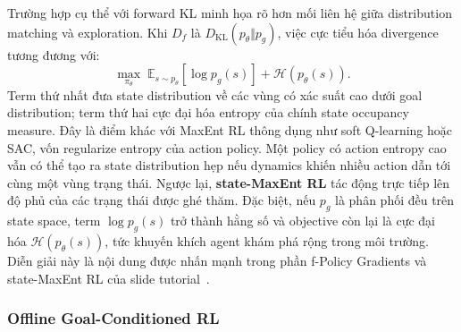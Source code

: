 Trường hợp cụ thể với forward KL minh họa rõ hơn mối liên hệ giữa distribution matching và exploration.
Khi $D_f$ là $D_{\mathrm{KL}}(p_\theta\Vert p_g)$, việc cực tiểu hóa divergence tương đương với:
\begin{equation}
    \max_{\pi_\theta}
    \;
    \mathbb{E}_{s\sim p_\theta}
    \left[
        \log p_g(s)
    \right]
    +
    \mathcal{H}\!\left(p_\theta(s)\right).
    \label{eq:tv2-state-maxent}
\end{equation}
Term thứ nhất đưa state distribution về các vùng có xác suất cao dưới goal distribution; term thứ hai cực đại hóa entropy của chính state occupancy measure.
Đây là điểm khác với MaxEnt RL thông dụng như soft Q-learning hoặc SAC, vốn regularize entropy của action policy.
Một policy có action entropy cao vẫn có thể tạo ra state distribution hẹp nếu dynamics khiến nhiều action dẫn tới cùng một vùng trạng thái.
Ngược lại, \textbf{state-MaxEnt RL} tác động trực tiếp lên độ phủ của các trạng thái được ghé thăm.
Đặc biệt, nếu $p_g$ là phân phối đều trên state space, term $\log p_g(s)$ trở thành hằng số và objective còn lại là cực đại hóa $\mathcal{H}(p_\theta(s))$, tức khuyến khích agent khám phá rộng trong môi trường.
Diễn giải này là nội dung được nhấn mạnh trong phần f-Policy Gradients và state-MaxEnt RL của slide tutorial~\cite{eysenbach2025generativerl}.

\subsubsection{Offline Goal-Conditioned RL}

